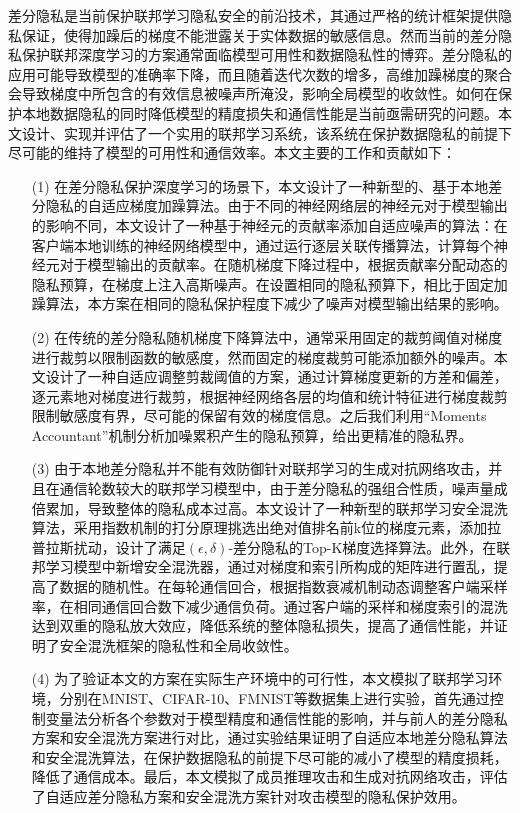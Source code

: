 差分隐私是当前保护联邦学习隐私安全的前沿技术，其通过严格的统计框架提供隐私保证，使得加躁后的梯度不能泄露关于实体数据的敏感信息。然而当前的差分隐私保护联邦深度学习的方案通常面临模型可用性和数据隐私性的博弈。差分隐私的应用可能导致模型的准确率下降，而且随着迭代次数的增多，高维加躁梯度的聚合会导致梯度中所包含的有效信息被噪声所淹没，影响全局模型的收敛性。如何在保护本地数据隐私的同时降低模型的精度损失和通信性能是当前亟需研究的问题。本文设计、实现并评估了一个实用的联邦学习系统，该系统在保护数据隐私的前提下尽可能的维持了模型的可用性和通信效率。本文主要的工作和贡献如下：
\begin{enumerate}
\item [(1)] 在差分隐私保护深度学习的场景下，本文设计了一种新型的、基于本地差分隐私的自适应梯度加躁算法。由于不同的神经网络层的神经元对于模型输出的影响不同，本文设计了一种基于神经元的贡献率添加自适应噪声的算法：在客户端本地训练的神经网络模型中，通过运行逐层关联传播算法，计算每个神经元对于模型输出的贡献率。在随机梯度下降过程中，根据贡献率分配动态的隐私预算，在梯度上注入高斯噪声。在设置相同的隐私预算下，相比于固定加躁算法，本方案在相同的隐私保护程度下减少了噪声对模型输出结果的影响。

\item [(2)]在传统的差分隐私随机梯度下降算法中，通常采用固定的裁剪阈值对梯度进行裁剪以限制函数的敏感度，然而固定的梯度裁剪可能添加额外的噪声。本文设计了一种自适应调整剪裁阈值的方案，通过计算梯度更新的方差和偏差，逐元素地对梯度进行裁剪，根据神经网络各层的均值和统计特征进行梯度裁剪限制敏感度有界，尽可能的保留有效的梯度信息。之后我们利用“Moments Accountant”机制分析加噪累积产生的隐私预算，给出更精准的隐私界。

\item [(3)]由于本地差分隐私并不能有效防御针对联邦学习的生成对抗网络攻击，并且在通信轮数较大的联邦学习模型中，由于差分隐私的强组合性质，噪声量成倍累加，导致整体的隐私成本过高。本文设计了一种新型的联邦学习安全混洗算法，采用指数机制的打分原理挑选出绝对值排名前k位的梯度元素，添加拉普拉斯扰动，设计了满足$(\epsilon, \delta)$-差分隐私的Top-K梯度选择算法。此外，在联邦学习模型中新增安全混洗器，通过对梯度和索引所构成的矩阵进行置乱，提高了数据的随机性。在每轮通信回合，根据指数衰减机制动态调整客户端采样率，在相同通信回合数下减少通信负荷。通过客户端的采样和梯度索引的混洗达到双重的隐私放大效应，降低系统的整体隐私损失，提高了通信性能，并证明了安全混洗框架的隐私性和全局收敛性。

\item [(4)]为了验证本文的方案在实际生产环境中的可行性，本文模拟了联邦学习环境，分别在MNIST、CIFAR-10、FMNIST等数据集上进行实验，首先通过控制变量法分析各个参数对于模型精度和通信性能的影响，并与前人的差分隐私方案和安全混洗方案进行对比，通过实验结果证明了自适应本地差分隐私算法和安全混洗算法，在保护数据隐私的前提下尽可能的减小了模型的精度损耗，降低了通信成本。最后，本文模拟了成员推理攻击和生成对抗网络攻击，评估了自适应差分隐私方案和安全混洗方案针对攻击模型的隐私保护效用。

\end{enumerate}
\hspace{-0.5cm}
 
